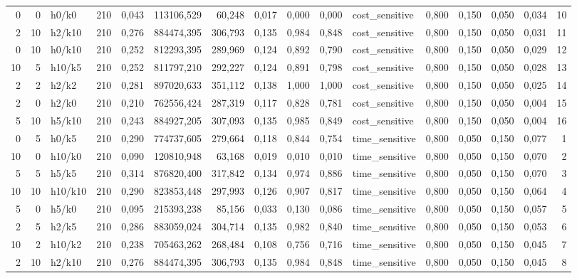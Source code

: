 \begin{longtable}{rrlrrrrrrrlrrrrr}
0 & 0 & h0/k0 & 210 & 0,043 & 113106,529 & 60,248 & 0,017 & 0,000 & 0,000 & cost\_sensitive & 0,800 & 0,150 & 0,050 & 0,034 & 10 \\
2 & 10 & h2/k10 & 210 & 0,276 & 884474,395 & 306,793 & 0,135 & 0,984 & 0,848 & cost\_sensitive & 0,800 & 0,150 & 0,050 & 0,031 & 11 \\
0 & 10 & h0/k10 & 210 & 0,252 & 812293,395 & 289,969 & 0,124 & 0,892 & 0,790 & cost\_sensitive & 0,800 & 0,150 & 0,050 & 0,029 & 12 \\
10 & 5 & h10/k5 & 210 & 0,252 & 811797,210 & 292,227 & 0,124 & 0,891 & 0,798 & cost\_sensitive & 0,800 & 0,150 & 0,050 & 0,028 & 13 \\
2 & 2 & h2/k2 & 210 & 0,281 & 897020,633 & 351,112 & 0,138 & 1,000 & 1,000 & cost\_sensitive & 0,800 & 0,150 & 0,050 & 0,025 & 14 \\
2 & 0 & h2/k0 & 210 & 0,210 & 762556,424 & 287,319 & 0,117 & 0,828 & 0,781 & cost\_sensitive & 0,800 & 0,150 & 0,050 & 0,004 & 15 \\
5 & 10 & h5/k10 & 210 & 0,243 & 884927,205 & 307,093 & 0,135 & 0,985 & 0,849 & cost\_sensitive & 0,800 & 0,150 & 0,050 & 0,004 & 16 \\
0 & 5 & h0/k5 & 210 & 0,290 & 774737,605 & 279,664 & 0,118 & 0,844 & 0,754 & time\_sensitive & 0,800 & 0,050 & 0,150 & 0,077 & 1 \\
10 & 0 & h10/k0 & 210 & 0,090 & 120810,948 & 63,168 & 0,019 & 0,010 & 0,010 & time\_sensitive & 0,800 & 0,050 & 0,150 & 0,070 & 2 \\
5 & 5 & h5/k5 & 210 & 0,314 & 876820,400 & 317,842 & 0,134 & 0,974 & 0,886 & time\_sensitive & 0,800 & 0,050 & 0,150 & 0,070 & 3 \\
10 & 10 & h10/k10 & 210 & 0,290 & 823853,448 & 297,993 & 0,126 & 0,907 & 0,817 & time\_sensitive & 0,800 & 0,050 & 0,150 & 0,064 & 4 \\
5 & 0 & h5/k0 & 210 & 0,095 & 215393,238 & 85,156 & 0,033 & 0,130 & 0,086 & time\_sensitive & 0,800 & 0,050 & 0,150 & 0,057 & 5 \\
2 & 5 & h2/k5 & 210 & 0,286 & 883059,024 & 304,714 & 0,135 & 0,982 & 0,840 & time\_sensitive & 0,800 & 0,050 & 0,150 & 0,053 & 6 \\
10 & 2 & h10/k2 & 210 & 0,238 & 705463,262 & 268,484 & 0,108 & 0,756 & 0,716 & time\_sensitive & 0,800 & 0,050 & 0,150 & 0,045 & 7 \\
2 & 10 & h2/k10 & 210 & 0,276 & 884474,395 & 306,793 & 0,135 & 0,984 & 0,848 & time\_sensitive & 0,800 & 0,050 & 0,150 & 0,045 & 8 \\

\end{longtable}
